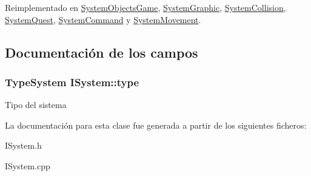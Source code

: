 Reimplementado en \hyperlink{classSystemObjectsGame_ad238ad4e70fb3cc2a5648a7176e69233}{System\+Objects\+Game}, \hyperlink{classSystemGraphic_a0d46ab172987eed86b45ae016240034e}{System\+Graphic}, \hyperlink{classSystemCollision_a731cd70ffedfa221454348ad975ee82c}{System\+Collision}, \hyperlink{classSystemQuest_a3069bdc81a590c47c4479b63add3fc3d}{System\+Quest}, \hyperlink{classSystemCommand_a0ff2e49835ef779e59f04c56fcc87ee1}{System\+Command} y \hyperlink{classSystemMovement_afd66e76ecd00084594be9334434a689d}{System\+Movement}.



\subsection{Documentación de los campos}
\hypertarget{classISystem_ae9154cb0a7d9560f0bfa9169a384a995}{}
\subsubsection[{type}]{\setlength{\rightskip}{0pt plus 5cm}Type\+System I\+System\+::type\hspace{0.3cm}{\ttfamily [protected]}}\label{classISystem_ae9154cb0a7d9560f0bfa9169a384a995}
Tipo del sistema 

La documentación para esta clase fue generada a partir de los siguientes ficheros\+:\begin{DoxyCompactItemize}
\item 
I\+System.\+h\item 
I\+System.\+cpp\end{DoxyCompactItemize}
